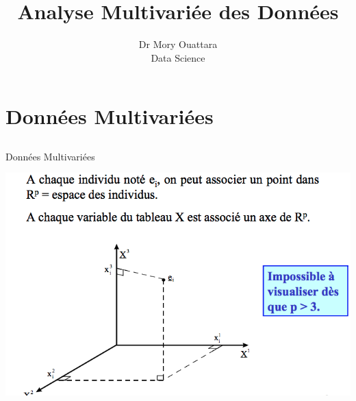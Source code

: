 \documentclass[10pt]{beamer}
\author{Dr Mory Ouattara\\  Data Science }
\title{Analyse Multivariée des Données}
\institute{INPHB}
\date{ }
\begin{document}
\begin{frame}
\titlepage
\end{frame}

\begin{frame}
\tableofcontents
\end{frame}

\section{Données Multivariées}

\subsection{ }





\begin{frame}{Données Multivariées}

  
\centering 
 \includegraphics[scale=0.45]{Proj1.png} 
 

\end{frame}
\end{document}
